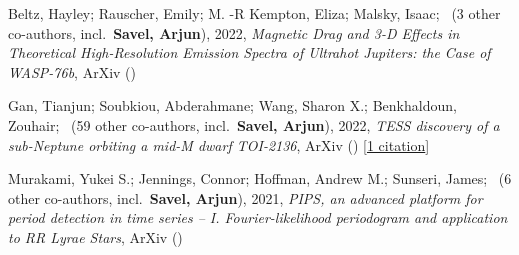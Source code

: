 \item[{\color{numcolor}\scriptsize3}] Beltz, Hayley; Rauscher, Emily; M. -R Kempton, Eliza; Malsky, Isaac; \etal\ ({3} other co-authors, incl.\ \textbf{Savel, Arjun}), 2022, \emph{Magnetic Drag and 3-D Effects in Theoretical High-Resolution Emission Spectra of Ultrahot Jupiters: the Case of WASP-76b}, ArXiv ()

\item[{\color{numcolor}\scriptsize2}] Gan, Tianjun; Soubkiou, Abderahmane; Wang, Sharon X.; Benkhaldoun, Zouhair; \etal\ ({59} other co-authors, incl.\ \textbf{Savel, Arjun}), 2022, \emph{TESS discovery of a sub-Neptune orbiting a mid-M dwarf TOI-2136}, ArXiv () [\href{https://ui.adsabs.harvard.edu/abs/2022arXiv220210024G}{1 citation}]

\item[{\color{numcolor}\scriptsize1}] Murakami, Yukei S.; Jennings, Connor; Hoffman, Andrew M.; Sunseri, James; \etal\ ({6} other co-authors, incl.\ \textbf{Savel, Arjun}), 2021, \emph{PIPS, an advanced platform for period detection in time series -- I. Fourier-likelihood periodogram and application to RR Lyrae Stars}, ArXiv ()
